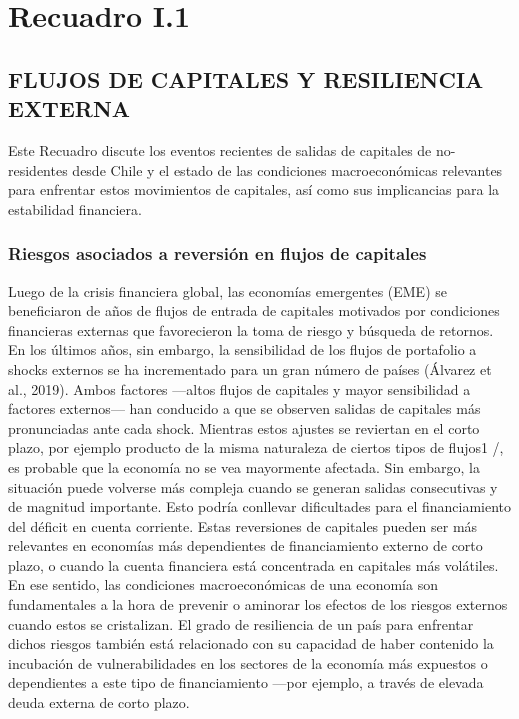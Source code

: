 \documentclass[
]{book}
\begin{document}
\hypertarget{RI.1}{%
\section*{Recuadro I.1}\label{RI.1}}

\hypertarget{RI.12}{%
\subsection*{\texorpdfstring{\textbf{FLUJOS DE CAPITALES Y RESILIENCIA EXTERNA}}{FLUJOS DE CAPITALES Y RESILIENCIA EXTERNA}}\label{RI.12}}

Este Recuadro discute los eventos recientes de salidas de
capitales de no-residentes desde Chile y el estado de las
condiciones macroeconómicas relevantes para enfrentar estos
movimientos de capitales, así como sus implicancias para la
estabilidad financiera.

\hypertarget{RI.13}{%
\subsubsection*{\texorpdfstring{\textbf{Riesgos asociados a reversión en flujos de capitales}}{Riesgos asociados a reversión en flujos de capitales}}\label{RI.13}}

Luego de la crisis financiera global, las economías emergentes
(EME) se beneficiaron de años de flujos de entrada de capitales
motivados por condiciones financieras externas que favorecieron
la toma de riesgo y búsqueda de retornos. En los últimos años,
sin embargo, la sensibilidad de los flujos de portafolio a shocks
externos se ha incrementado para un gran número de países
(Álvarez et al., 2019). Ambos factores ---altos flujos de capitales
y mayor sensibilidad a factores externos--- han conducido
a que se observen salidas de capitales más pronunciadas
ante cada shock. Mientras estos ajustes se reviertan en el
corto plazo, por ejemplo producto de la misma naturaleza de
ciertos tipos de flujos1
/, es probable que la economía no se vea
mayormente afectada. Sin embargo, la situación puede volverse
más compleja cuando se generan salidas consecutivas y de
magnitud importante. Esto podría conllevar dificultades para el
financiamiento del déficit en cuenta corriente.
Estas reversiones de capitales pueden ser más relevantes en
economías más dependientes de financiamiento externo de
corto plazo, o cuando la cuenta financiera está concentrada
en capitales más volátiles. En ese sentido, las condiciones
macroeconómicas de una economía son fundamentales a la
hora de prevenir o aminorar los efectos de los riesgos externos
cuando estos se cristalizan. El grado de resiliencia de un país
para enfrentar dichos riesgos también está relacionado con su
capacidad de haber contenido la incubación de vulnerabilidades
en los sectores de la economía más expuestos o dependientes a
este tipo de financiamiento ---por ejemplo, a través de elevada
deuda externa de corto plazo.
\end{document}
